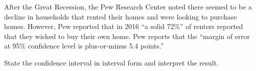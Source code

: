 \documentclass[../mathNotesPreamble]{subfiles}
\begin{document}
    \begin{ex*}
      After the Great Recession, the Pew Research Center noted there seemed to be a decline in households that rented their homes and were looking to purchase homes. However, Pew reported that in 2016 ``a solid 72\%'' of renters reported that they wished to buy their own home. Pew reports that the ``margin of error at 95\% confidence level is plus-or-minus 5.4 points.''
      
      State the confidence interval in interval form and interpret the result.
    \end{ex*}
    \pagebreak

  \pagebreak
\end{document}
